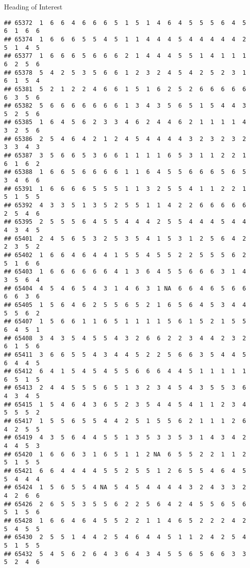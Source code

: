 \documentclass[
  ignorenonframetext,
]{beamer}
\begin{document}
\begin{frame}[fragile]{Heading of Interest}
\begin{verbatim}
## 65372  1  6  6  4  6  6  6  5  1  5  1  4  6  4  5  5  5  6  4  5  6  1  6  6
## 65374  1  6  6  6  5  5  4  5  1  1  4  4  4  5  4  4  4  4  4  2  5  1  4  5
## 65377  1  6  6  6  5  6  6  6  2  1  4  4  4  5  5  1  4  1  1  1  6  2  5  6
## 65378  5  4  2  5  3  5  6  6  1  2  3  2  4  5  4  2  5  2  3  1  6  1  5  4
## 65381  5  2  1  2  2  4  6  6  1  5  1  6  2  5  2  6  6  6  6  6  6  3  5  6
## 65382  5  6  6  6  6  6  6  6  1  3  4  3  5  6  5  1  5  4  4  3  5  2  5  6
## 65385  1  6  4  5  6  2  3  3  4  6  2  4  4  6  2  1  1  1  1  4  3  2  5  6
## 65386  2  5  4  6  4  2  1  2  4  5  4  4  4  4  3  2  3  2  3  2  3  3  4  3
## 65387  3  5  6  6  5  3  6  6  1  1  1  1  6  5  3  1  1  2  2  1  6  1  6  2
## 65388  1  6  6  5  6  6  6  6  1  1  6  4  5  5  6  6  6  5  6  5  3  4  6  6
## 65391  1  6  6  6  6  5  5  5  1  1  3  2  5  5  4  1  1  2  2  1  5  1  5  5
## 65392  4  3  3  5  1  3  5  2  5  5  1  1  4  2  2  6  6  6  6  6  2  5  4  6
## 65395  2  5  5  5  6  4  5  5  4  4  4  2  5  5  4  4  4  5  4  4  4  3  4  5
## 65401  2  4  5  6  5  3  2  5  3  5  4  1  5  3  1  2  5  6  4  2  2  3  5  2
## 65402  1  6  6  4  6  4  4  1  5  5  4  5  5  2  2  5  5  5  6  2  5  1  6  6
## 65403  1  6  6  6  6  6  6  4  1  3  6  4  5  5  6  6  6  3  1  4  3  5  6  4
## 65404  4  5  4  6  5  4  3  1  4  6  3  1 NA  6  6  4  6  5  6  6  6  6  3  6
## 65405  1  5  6  4  6  2  5  5  6  5  2  1  6  5  6  4  5  3  4  4  5  5  6  2
## 65407  1  5  6  6  1  1  6  5  1  1  1  1  5  6  1  5  2  1  5  5  6  4  5  1
## 65408  3  4  3  5  4  5  5  4  3  2  6  6  2  2  3  4  4  2  3  2  6  1  5  6
## 65411  3  6  6  5  5  4  3  4  4  5  2  2  5  6  6  3  5  4  4  5  6  4  4  5
## 65412  6  4  1  5  4  5  4  5  5  6  6  6  4  4  5  1  1  1  1  1  6  5  1  5
## 65413  2  4  4  5  5  5  6  5  1  3  2  3  4  5  4  3  5  5  3  6  4  3  4  5
## 65415  1  5  4  6  4  3  6  5  2  3  5  4  4  5  4  1  1  2  3  4  5  5  5  2
## 65417  1  5  5  6  5  5  4  4  2  5  1  5  5  6  2  1  1  1  2  6  4  2  5  5
## 65419  4  3  5  6  4  4  5  5  1  3  5  3  3  5  3  1  4  3  4  2  4  4  5  3
## 65420  1  6  6  6  3  1  6  5  1  1  2 NA  6  5  5  2  2  1  1  2  5  1  5  5
## 65421  6  6  4  4  4  4  5  5  2  5  5  1  2  6  5  5  4  6  4  5  5  4  4  4
## 65424  1  5  6  5  5  4 NA  5  4  5  4  4  4  4  3  2  4  3  3  2  4  2  6  6
## 65426  2  6  5  5  3  5  5  6  2  2  5  6  4  2  4  5  5  6  5  6  5  1  5  6
## 65428  1  6  6  4  6  4  5  5  2  2  1  1  4  6  5  2  2  2  4  2  5  4  5  5
## 65430  2  5  5  1  4  4  2  5  4  6  4  4  5  1  1  2  4  2  5  4  5  1  5  5
## 65432  5  4  5  6  2  6  4  3  6  4  3  4  5  5  6  5  6  6  3  3  5  2  4  6

\end{verbatim}
\end{frame}
\end{document}
